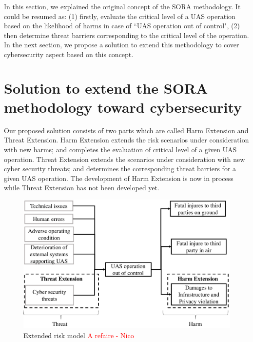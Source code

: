 \documentclass[a4paper, 10, conference]{ieeeconf}  %
\begin{document}
In this section, we explained the original concept of the SORA methodology. It could be resumed as: (1) firstly, evaluate the critical level of a UAS operation based on the likelihood of harms in case of ``UAS operation out of control", (2) then determine threat barriers corresponding to the critical level of the operation. In the next section, we propose a solution to extend this methodology to cover cybersecurity aspect based on this concept.

\section{Solution to extend the SORA methodology toward cybersecurity}\label{sec:frame}

Our proposed solution consists of two parts which are called Harm Extension and Threat Extension. Harm Extension extends the risk scenarios under consideration with new harms; and completes the evaluation of critical level of a given UAS operation. Threat Extension extends the scenarios under consideration with new cyber security threats; and determines the corresponding threat barriers for a given UAS operation. The development of Harm Extension is now in process while Threat Extension has not been developed yet.
\begin{figure}[!ht]
	\centering
	\includegraphics[width=3.3 in]{image/extended_SORA.pdf}
	\caption{Extended risk model \textcolor{red}{A refaire - Nico}}
	\label{figure: Extended risk model}
\end{figure}
\end{document}
